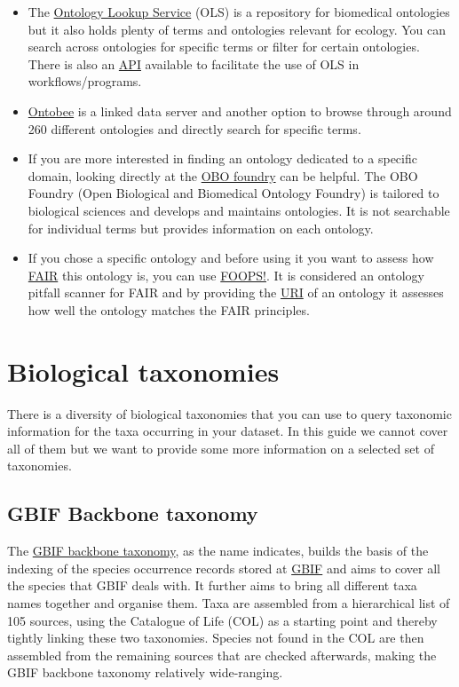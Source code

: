 \documentclass[
]{book}
\begin{document}
\begin{itemize}
\item
  The \href{http://ebi.ac.uk/ols4/}{Ontology Lookup Service} (OLS) is a repository for biomedical ontologies but it also holds plenty of terms and ontologies relevant for ecology. You can search across ontologies for specific terms or filter for certain ontologies. There is also an \protect\hyperlink{API}{API} available to facilitate the use of OLS in workflows/programs.
\item
  \href{http://ontobee.org}{Ontobee} is a linked data server and another option to browse through around 260 different ontologies and directly search for specific terms.
\item
  If you are more interested in finding an ontology dedicated to a specific domain, looking directly at the \href{http://obofoundry.org/}{OBO foundry} can be helpful. The OBO Foundry (Open Biological and Biomedical Ontology Foundry) is tailored to biological sciences and develops and maintains ontologies. It is not searchable for individual terms but provides information on each ontology.
\item
  If you chose a specific ontology and before using it you want to assess how \protect\hyperlink{FAIR}{FAIR} this ontology is, you can use \href{https://foops.linkeddata.es/FAIR_validator.html\#}{FOOPS!}. It is considered an ontology pitfall scanner for FAIR and by providing the \protect\hyperlink{URI}{URI} of an ontology it assesses how well the ontology matches the FAIR principles.
\end{itemize}

\hypertarget{biological-taxonomies}{%
\section{Biological taxonomies}\label{biological-taxonomies}}

There is a diversity of biological taxonomies that you can use to query taxonomic information for the taxa occurring in your dataset. In this guide we cannot cover all of them but we want to provide some more information on a selected set of taxonomies.

\hypertarget{gbif-backbone-taxonomy}{%
\subsection{GBIF Backbone taxonomy}\label{gbif-backbone-taxonomy}}

The \href{https://doi.org/10.15468/39omei}{GBIF backbone taxonomy}, as the name indicates, builds the basis of the indexing of the species occurrence records stored at \protect\hyperlink{GBIF}{GBIF} and aims to cover all the species that GBIF deals with. It further aims to bring all different taxa names together and organise them. Taxa are assembled from a hierarchical list of 105 sources, using the Catalogue of Life (COL) as a starting point and thereby tightly linking these two taxonomies. Species not found in the COL are then assembled from the remaining sources that are checked afterwards, making the GBIF backbone taxonomy relatively wide-ranging.
\end{document}
